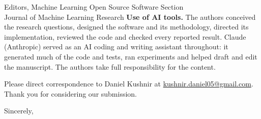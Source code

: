 \documentclass[11pt]{letter}
\begin{document}
\begin{letter}{Editors, Machine Learning Open Source Software Section\\
Journal of Machine Learning Research}
\textbf{Use of AI tools.} The authors conceived the research questions, designed the software and its methodology,
directed its implementation, reviewed the code and checked every reported result. Claude (Anthropic) served as an AI
coding and writing assistant throughout: it generated much of the code and tests, ran experiments and helped draft and
edit the manuscript. The authors take full responsibility for the content.

Please direct correspondence to Daniel Kushnir at \href{mailto:kushnir.daniel05@gmail.com}{kushnir.daniel05@gmail.com}.
Thank you for considering our submission.

\closing{Sincerely,}

\end{letter}
\end{document}
